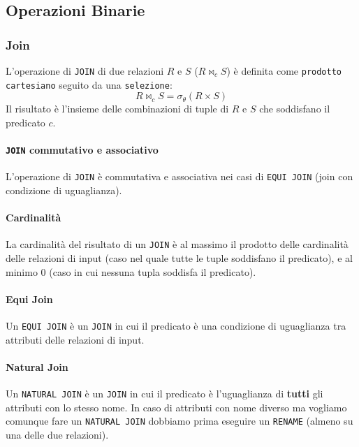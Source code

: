     \subsection{Operazioni Binarie}    
        \subsubsection{Join}
            L'operazione di \texttt{JOIN} di due relazioni $ R $ e $ S $ ($ R \Join_c S $) è definita come \texttt{prodotto cartesiano} seguito da una \texttt{selezione}:
            $$
                R \Join_c S = \sigma_{\theta} (R \times S)
            $$
            Il risultato è l'insieme delle combinazioni di tuple di $ R $ e $ S $ che soddisfano il predicato $ c $. 
            \paragraph{\texttt{JOIN} commutativo e associativo} L'operazione di \texttt{JOIN} è commutativa e associativa nei casi di \texttt{EQUI JOIN} (join con condizione di uguaglianza).
            \paragraph{Cardinalità} La cardinalità del risultato di un \texttt{JOIN} è al massimo il prodotto delle cardinalità delle relazioni di input (caso nel quale tutte le tuple soddisfano il predicato), e al minimo 0 (caso in cui nessuna tupla soddisfa il predicato).
            \paragraph{Equi Join} Un \texttt{EQUI JOIN} è un \texttt{JOIN} in cui il predicato è una condizione di uguaglianza tra attributi delle relazioni di input.
            \paragraph{Natural Join} Un \texttt{NATURAL JOIN} è un \texttt{JOIN} in cui il predicato è l'uguaglianza di \textbf{tutti} gli attributi con lo stesso nome. In caso di attributi con nome diverso ma vogliamo comunque fare un \texttt{NATURAL JOIN} dobbiamo prima eseguire un \texttt{RENAME} (almeno su una delle due relazioni). 
